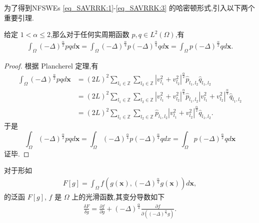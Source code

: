 为了得到NFSWEs \eqref{eq_SAVRRK:1}-\eqref{eq_SAVRRK:3} 的哈密顿形式,引入以下两个重要引理.
\begin{lemma}\label{lem_PAVF:1}
	\cite{fuStructurepreservingAlgorithmsTwodimensional2020} 
	 给定 $1<\alpha \leq 2$,那么对于任何实周期函数 $p, q \in L^{2}(\Omega)$,有
	\begin{align}\label{eq_PAVF:22}
	\int_{\Omega}(-\Delta)^{\frac{\alpha}{2}} p q d \boldsymbol{x}=\int_{\Omega}(-\Delta)^{\frac{\alpha}{4}} p(-\Delta)^{\frac{\alpha}{4}} q d \boldsymbol{x}=\int_{\Omega} p(-\Delta)^{\frac{\alpha}{2}} q d \boldsymbol{x}.
	\end{align}
	\end{lemma}

\begin{proof}
	根据 Plancherel 定理,有
\begin{equation}
\begin{aligned}
\int_{\Omega}(-\Delta)^{\frac{\alpha}{2}} p q d \boldsymbol{x} &=(2 L)^{2} \sum_{l_{1} \in \mathbb{Z}} \sum_{l_{2} \in \mathbb{Z}}\left|v_{l_{1}}^{2}+v_{l_{2}}^{2}\right|^{\frac{\alpha}{2}} \hat{p}_{l_{1}, l_{2}} \hat{q}_{l_{1}, l_{2}} \\
&=(2 L)^{2} \sum_{l_{1} \in \mathbb{Z}} \sum_{l_{2} \in \mathbb{Z}}\left|v_{l_{1}}^{2}+v_{l_{2}}^{2}\right|^{\frac{\alpha}{4}} \hat{p}_{l_{1}, l_{2}}\left|v_{l_{1}}^{2}+v_{l_{2}}^{2}\right|^{\frac{\alpha}{4}} \hat{q}_{l_{1}, l_{2}} \\
&=(2 L)^{2} \sum_{l_{1} \in \mathbb{Z}} \sum_{l_{2} \in \mathbb{Z}} \hat{p}_{l_{1}, l_{2}}\left|v_{l_{1}}^{2}+v_{l_{2}}^{2}\right|^{\frac{\alpha}{2}} \hat{q}_{l_{1}, l_{2}} .
\end{aligned}
\label{eq_23}\end{equation}
于是
\begin{equation}
\int_{\Omega}(-\Delta)^{\frac{\alpha}{2}} p q d \boldsymbol{x}=\int_{\Omega}(-\Delta)^{\frac{\alpha}{4}} p(-\Delta)^{\frac{\alpha}{4}} q d x=\int_{\Omega} p(-\Delta)^{\frac{\alpha}{2}} q d \boldsymbol{x}
\label{eq_24}\end{equation}
证毕.
\end{proof}


\begin{lemma}\label{lem_PAVF:2}
	\cite{wangStructurepreservingNumericalMethods2018} 
	 对于形如
	\begin{align}\label{eq_PAVF:25}
	F[g]=\int_{\Omega} f\left(g(\boldsymbol{x}),(-\Delta)^{\frac{\alpha}{4}} g(\boldsymbol{x})\right) d \boldsymbol{x},
	\end{align}
	的泛函 $F[g]$, $f$ 是 $\Omega$ 上的光滑函数,其变分导数如下
	\begin{align}\label{eq_PAVF:26}
	\frac{\delta F}{\delta g}=\frac{\partial f}{\partial g}+(-\Delta)^{\frac{\alpha}{4}} \frac{\partial f}{\partial\left((-\Delta)^{\frac{\alpha}{4}} g\right)} .
	\end{align}
	\end{lemma}


